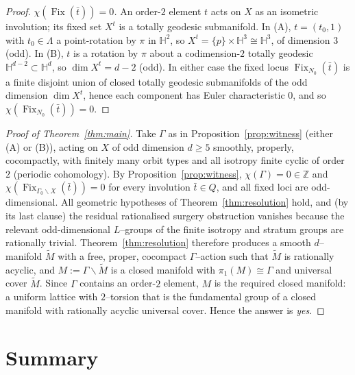 \documentclass[12pt]{article}
\newcommand{\bZ}{\mathbb{Z}}
\newcommand{\bH}{\mathbb{H}}
\newcommand{\Fix}{\operatorname{Fix}}
\theoremstyle{definition}
\begin{document}
\begin{proof}
\emph{$\chi(\Fix(\bar t))=0$.}  An order-$2$ element $t$ acts on $X$ as an
isometric involution; its fixed set $X^{t}$ is a totally geodesic submanifold.
In (A), $t=(t_0,1)$ with $t_0\in\Lambda$ a point-rotation by $\pi$ in $\bH^2$, so
$X^{t}=\{p\}\times\bH^3\cong\bH^3$, of dimension $3$ (odd).  In (B), $t$ is a
rotation by $\pi$ about a codimension-$2$ totally geodesic
$\bH^{d-2}\subset\bH^d$, so $\dim X^{t}=d-2$ (odd).  In either case the fixed
locus $\Fix_{N_0}(\bar t)$ is a finite disjoint union of closed totally geodesic
submanifolds of the odd dimension $\dim X^{t}$, hence each component has Euler
characteristic $0$, and so $\chi(\Fix_{N_0}(\bar t))=0$.
\end{proof}

\begin{proof}[Proof of Theorem~\ref{thm:main}]
Take $\Gamma$ as in Proposition~\ref{prop:witness} (either (A) or (B)), acting on
$X$ of odd dimension $d\ge5$ smoothly, properly, cocompactly, with finitely many
orbit types and all isotropy finite cyclic of order $2$ (periodic cohomology).  By
Proposition~\ref{prop:witness}, $\chi(\Gamma)=0\in\bZ$ and
$\chi(\Fix_{\Gamma_0\backslash X}(\bar t))=0$ for every involution $\bar t\in Q$,
and all fixed loci are odd-dimensional.  All geometric hypotheses of
Theorem~\ref{thm:resolution} hold, and (by its last clause) the residual
rationalised surgery obstruction vanishes because the relevant odd-dimensional
$L$--groups of the finite isotropy and stratum groups are rationally trivial.
Theorem~\ref{thm:resolution} therefore produces a smooth $d$--manifold
$\widetilde M$ with a free, proper, cocompact $\Gamma$--action such that
$\widetilde M$ is rationally acyclic, and $M:=\Gamma\backslash\widetilde M$ is a
closed manifold with $\pi_1(M)\cong\Gamma$ and universal cover $\widetilde M$.
Since $\Gamma$ contains an order-$2$ element, $M$ is the required closed manifold:
a uniform lattice with $2$--torsion that is the fundamental group of a closed
manifold with rationally acyclic universal cover.  Hence the answer is
\emph{yes}.
\end{proof}

\section{Summary}
\end{document}
